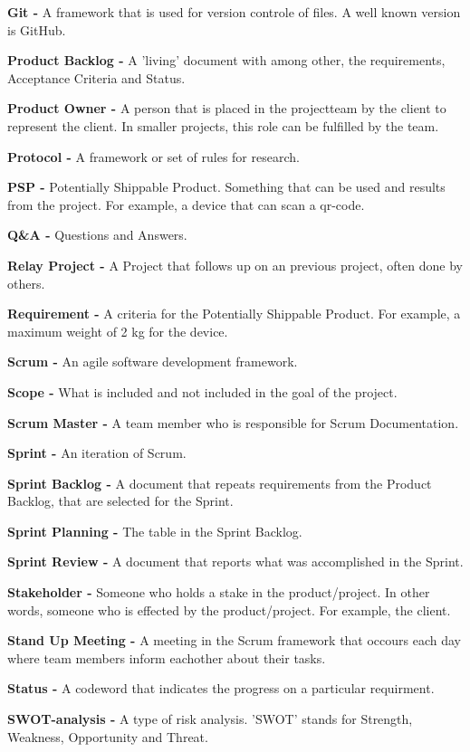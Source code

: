 \documentclass[10pt]{report}
\begin{document}
\textbf{Git -} A framework that is used for version controle of files. A well known version is GitHub.

\textbf{Product Backlog -} A 'living' document with among other, the requirements, Acceptance Criteria and Status.

\textbf{Product Owner -} A person that is placed in the projectteam by the client to represent the client. In smaller projects, this role can be fulfilled by the team.

\textbf{Protocol -} A framework or set of rules for research.

\textbf{PSP -} Potentially Shippable Product. Something that can be used and results from the project. For example, a device that can scan a qr-code.

\textbf{Q\&A -} Questions and Answers.

\textbf{Relay Project -} A Project that follows up on an previous project, often done by others.

\textbf{Requirement -} A criteria for the Potentially Shippable Product. For example, a maximum weight of 2 kg for the device.

\textbf{Scrum -} An agile software development framework.

\textbf{Scope -} What is included and not included in the goal of the project.

\textbf{Scrum Master -} A team member who is responsible for Scrum Documentation.

\textbf{Sprint -} An iteration of Scrum.

\textbf{Sprint Backlog -} A document that repeats requirements from the Product Backlog, that are selected for the Sprint.

\textbf{Sprint Planning -} The table in the Sprint Backlog.

\textbf{Sprint Review -} A document that reports what was accomplished in the Sprint.

\textbf{Stakeholder -} Someone who holds a stake in the product/project. In other words, someone who is effected by the product/project. For example, the client.

\textbf{Stand Up Meeting -} A meeting in the Scrum framework that occours each day where team members inform eachother about their tasks.

\textbf{Status -} A codeword that indicates the progress on a particular requirment.

\textbf{SWOT-analysis -} A type of risk analysis. 'SWOT' stands for Strength, Weakness, Opportunity and Threat.
\end{document}

